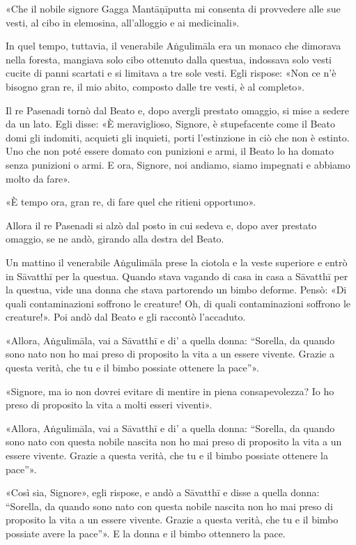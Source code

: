 «Che il nobile signore Gagga Mantāṇīputta mi consenta di provvedere alle sue
vesti, al cibo in elemosina, all’alloggio e ai medicinali».

In quel tempo, tuttavia, il venerabile Aṅgulimāla era un monaco che dimorava
nella foresta, mangiava solo cibo ottenuto dalla questua, indossava solo vesti
cucite di panni scartati e si limitava a tre sole vesti. Egli rispose: «Non ce
n’è bisogno gran re, il mio abito, composto dalle tre vesti, è al completo».

Il re Pasenadi tornò dal Beato e, dopo avergli prestato omaggio, si mise a
sedere da un lato. Egli disse: «È meraviglioso, Signore, è stupefacente come il
Beato domi gli indomiti, acquieti gli inquieti, porti l’estinzione in ciò che
non è estinto. Uno che non poté essere domato con punizioni e armi, il Beato lo
ha domato senza punizioni o armi. E ora, Signore, noi andiamo, siamo impegnati e
abbiamo molto da fare».

«È tempo ora, gran re, di fare quel che ritieni opportuno».

Allora il re Pasenadi si alzò dal posto in cui sedeva e, dopo aver prestato
omaggio, se ne andò, girando alla destra del Beato.

Un mattino il venerabile Aṅgulimāla prese la ciotola e la veste superiore e
entrò in Sāvatthī per la questua. Quando stava vagando di casa in casa a
Sāvatthī per la questua, vide una donna che stava partorendo un bimbo deforme.
Pensò: «Di quali contaminazioni soffrono le creature! Oh, di quali
contaminazioni soffrono le creature!». Poi andò dal Beato e gli raccontò
l’accaduto.

«Allora, Aṅgulimāla, vai a Sāvatthī e di' a quella donna: “Sorella, da quando
sono nato non ho mai preso di proposito la vita a un essere vivente. Grazie a
questa verità, che tu e il bimbo possiate ottenere la pace”».

«Signore, ma io non dovrei evitare di mentire in piena consapevolezza? Io ho
preso di proposito la vita a molti esseri viventi».

«Allora, Aṅgulimāla, vai a Sāvatthī e di' a quella donna: “Sorella, da quando
sono nato con questa nobile nascita non ho mai preso di proposito la vita a un
essere vivente. Grazie a questa verità, che tu e il bimbo possiate ottenere la
pace”».

«Così sia, Signore», egli rispose, e andò a Sāvatthī e disse a quella donna:
“Sorella, da quando sono nato con questa nobile nascita non ho mai preso di
proposito la vita a un essere vivente. Grazie a questa verità, che tu e il bimbo
possiate avere la pace”». E la donna e il bimbo ottennero la pace.

